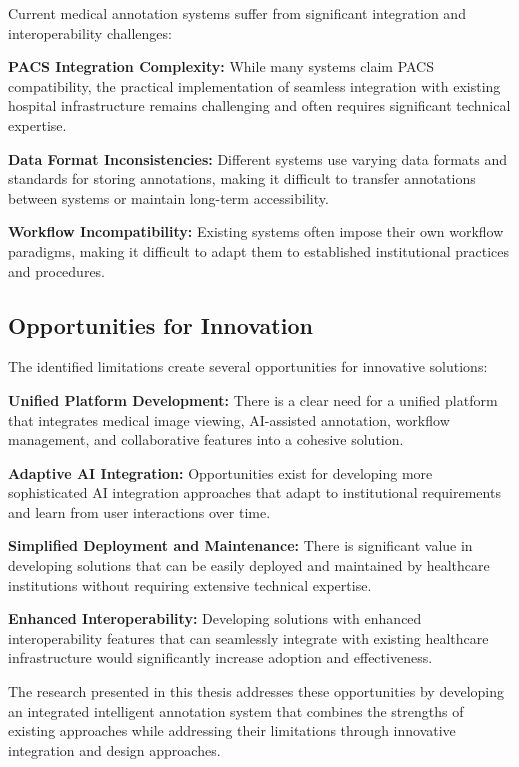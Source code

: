 Current medical annotation systems suffer from significant integration and interoperability challenges:

\textbf{PACS Integration Complexity:} While many systems claim PACS compatibility, the practical implementation of seamless integration with existing hospital infrastructure remains challenging and often requires significant technical expertise.

\textbf{Data Format Inconsistencies:} Different systems use varying data formats and standards for storing annotations, making it difficult to transfer annotations between systems or maintain long-term accessibility.

\textbf{Workflow Incompatibility:} Existing systems often impose their own workflow paradigms, making it difficult to adapt them to established institutional practices and procedures.

\subsection{Opportunities for Innovation}

The identified limitations create several opportunities for innovative solutions:

\textbf{Unified Platform Development:} There is a clear need for a unified platform that integrates medical image viewing, AI-assisted annotation, workflow management, and collaborative features into a cohesive solution.

\textbf{Adaptive AI Integration:} Opportunities exist for developing more sophisticated AI integration approaches that adapt to institutional requirements and learn from user interactions over time.

\textbf{Simplified Deployment and Maintenance:} There is significant value in developing solutions that can be easily deployed and maintained by healthcare institutions without requiring extensive technical expertise.

\textbf{Enhanced Interoperability:} Developing solutions with enhanced interoperability features that can seamlessly integrate with existing healthcare infrastructure would significantly increase adoption and effectiveness.

The research presented in this thesis addresses these opportunities by developing an integrated intelligent annotation system that combines the strengths of existing approaches while addressing their limitations through innovative integration and design approaches. 